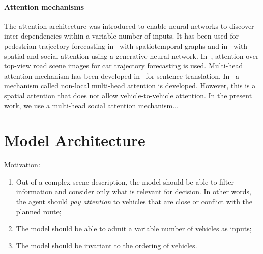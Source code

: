 \documentclass{article}
\begin{document}
\paragraph{Attention mechanisms} {The attention architecture was introduced to enable neural networks to discover inter-dependencies within a variable number of inputs.
It has been used for pedestrian trajectory forecasting in~\cite{Vemula2018} with spatiotemporal graphs and in~\cite{Sadeghian2019CVPR} with spatial and social attention using a generative neural network. In~\cite{Sadeghian2018ECCV}, attention over top-view road scene images for car trajectory forecasting is used. Multi-head attention mechanism has been developed in~\cite{Vaswani2017} for sentence translation. In~\cite{Messaoud2019} a mechanism called non-local multi-head attention is developed. However, this is a spatial attention that does not allow vehicle-to-vehicle attention. In the present work, we use a multi-head social attention mechanism...}

\section{Model Architecture}

Motivation: 
\begin{enumerate}
	\item Out of a complex scene description, the model should be able to filter information and consider only what is relevant for decision. In other words, the agent should \emph{pay attention} to vehicles that are close or conflict with the planned route;
	\item The model should be able to admit a variable number of vehicles as inputs;
	\item The model should be invariant to the ordering of vehicles.
\end{enumerate}
\end{document}
